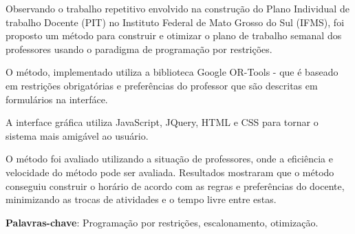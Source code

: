 \setlength{\absparsep}{18pt} %
\begin{resumo}
    Observando o trabalho repetitivo envolvido na construção do Plano Individual de trabalho Docente (PIT) no Instituto Federal de Mato Grosso do Sul (IFMS), foi proposto um método para construir e otimizar o plano de trabalho semanal dos professores usando o paradigma de programação por restrições.
    
    O método, implementado utiliza a biblioteca Google OR-Tools - que é baseado em restrições obrigatórias e preferências do professor que são descritas em formulários na interfáce.
    
    A interface gráfica utiliza JavaScript, JQuery, HTML e CSS para tornar o sistema mais amigável ao usuário.
    
    O método foi avaliado utilizando a situação de professores, onde a eficiência e velocidade do método pode ser avaliada. Resultados mostraram que o método conseguiu construir o horário de acordo com as regras e preferências do docente, minimizando as trocas de atividades e o tempo livre entre estas.

	\textbf{Palavras-chave}:  Programação por restrições, escalonamento, otimização.
\end{resumo}